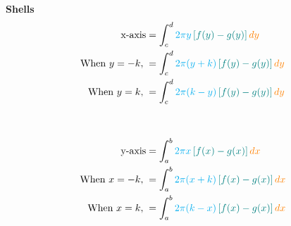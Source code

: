 \begin{framed}
  \noindent \textbf{Shells}
  \begin{align*}
    \text{x-axis} &= \int_c^d \textcolor{cyan}{2\pi y} \,
    \textcolor{teal}{[f(y)-g(y)]} \, \textcolor{orange}{dy}\\
    \text{When } y=-k, \; &= \int_c^d \textcolor{cyan}{2\pi (y+k)} \,
    \textcolor{teal}{[f(y)-g(y)]} \, \textcolor{orange}{dy}\\
    \text{When } y=k, \; &= \int_c^d \textcolor{cyan}{2\pi (k-y)} \,
    \textcolor{teal}{[f(y)-g(y)]} \, \textcolor{orange}{dy}\\\\\\
    \text{y-axis} &= \int_a^b \textcolor{cyan}{2\pi x} \,
    \textcolor{teal}{[f(x)-g(x)]} \, \textcolor{orange}{dx}\\
    \text{When } x=-k, \; &= \int_a^b \textcolor{cyan}{2\pi (x+k)} \,
    \textcolor{teal}{[f(x)-g(x)]} \, \textcolor{orange}{dx}\\
    \text{When } x=k, \; &= \int_a^b \textcolor{cyan}{2\pi (k-x)} \,
    \textcolor{teal}{[f(x)-g(x)]} \, \textcolor{orange}{dx}
  \end{align*}
\end{framed}